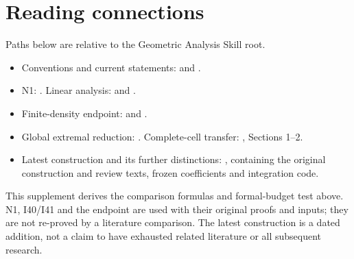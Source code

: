 \documentclass[11pt]{article}
\theoremstyle{remark}
\begin{document}
\section*{Reading connections}
Paths below are relative to the Geometric Analysis Skill root.
\begin{itemize}
\item Conventions and current statements:
 and
.
\item N1: .
Linear analysis: 
and .
\item Finite-density endpoint:
 and
.
\item Global extremal reduction:
.
Complete-cell transfer:
,
Sections 1--2.
\item Latest construction and its further distinctions:
, containing the original
construction and review texts, frozen coefficients and integration code.
\end{itemize}
This supplement derives the comparison formulas and formal-budget test
above. N1, I40/I41 and the endpoint are used with their original proofs
and inputs; they are not re-proved by a literature comparison. The latest
construction is a dated addition, not a claim to have exhausted related
literature or all subsequent research.
\end{document}
